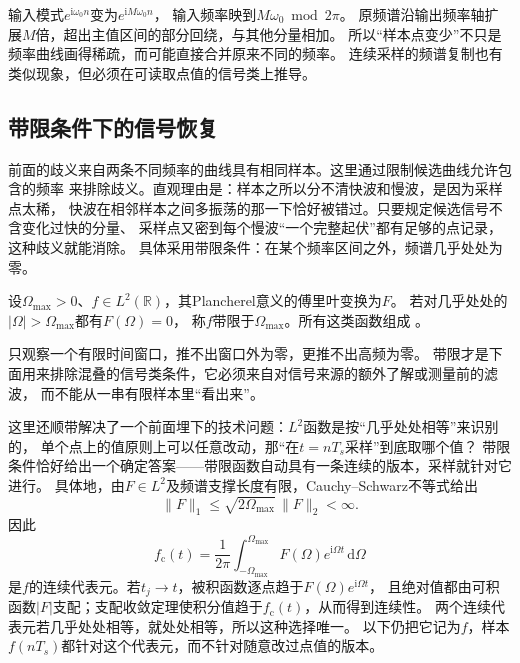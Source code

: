 输入模式$e^{\mathrm i\omega_0n}$变为$e^{\mathrm iM\omega_0n}$，
输入频率映到$M\omega_0\bmod2\pi$。
原频谱沿输出频率轴扩展$M$倍，超出主值区间的部分回绕，与其他分量相加。
所以“样本点变少”不只是频率曲线画得稀疏，而可能直接合并原来不同的频率。
连续采样的频谱复制也有类似现象，但必须在可读取点值的信号类上推导。

\subsection{带限条件下的信号恢复}
\label{sec:signal-bandlimited-recovery}

前面的歧义来自两条不同频率的曲线具有相同样本。这里通过限制候选曲线允许包含的频率
来排除歧义。直观理由是：样本之所以分不清快波和慢波，是因为采样点太稀，
快波在相邻样本之间多振荡的那一下恰好被错过。只要规定候选信号不含变化过快的分量、
采样点又密到每个慢波“一个完整起伏”都有足够的点记录，这种歧义就能消除。
具体采用带限条件：在某个频率区间之外，频谱几乎处处为零。
\begin{definition}[平方可积带限信号]
  \label{def:signal-analysis-bandlimited-space}
  设$\Omega_{\max}>0$、$f\in L^2(\mathbb R)$，其Plancherel意义的傅里叶变换为$F$。
  若对几乎处处的$|\Omega|>\Omega_{\max}$都有$F(\Omega)=0$，
  称$f$带限于$\Omega_{\max}$。所有这类函数组成
  。
\end{definition}
只观察一个有限时间窗口，推不出窗口外为零，更推不出高频为零。
带限才是下面用来排除混叠的信号类条件，它必须来自对信号来源的额外了解或测量前的滤波，
而不能从一串有限样本里“看出来”。

这里还顺带解决了一个前面埋下的技术问题：$L^2$函数是按“几乎处处相等”来识别的，
单个点上的值原则上可以任意改动，那“在$t=nT_s$采样”到底取哪个值？
带限条件恰好给出一个确定答案——带限函数自动具有一条连续的版本，采样就针对它进行。
具体地，由$F\in L^2$及频谱支撑长度有限，Cauchy--Schwarz不等式给出
\[
  \|F\|_1\leq\sqrt{2\Omega_{\max}}\,\|F\|_2<\infty.
\]
因此
\[
  f_{\mathrm c}(t)=\frac1{2\pi}\int_{-\Omega_{\max}}^{\Omega_{\max}}
  F(\Omega)e^{\mathrm i\Omega t}\,\mathrm d\Omega
\]
是$f$的连续代表元。若$t_j\to t$，被积函数逐点趋于$F(\Omega)e^{\mathrm i\Omega t}$，
且绝对值都由可积函数$|F|$支配；支配收敛定理使积分值趋于$f_{\mathrm c}(t)$，从而得到连续性。
两个连续代表元若几乎处处相等，就处处相等，所以这种选择唯一。
以下仍把它记为$f$，样本$f(nT_s)$都针对这个代表元，而不针对随意改过点值的版本。

